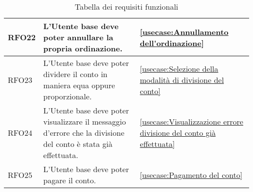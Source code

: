 \begin{table}[H]
\begin{tabularx}{\textwidth}{l|X|p{2cm}}
		\hline
		RFO22       & L'Utente base deve poter annullare la propria ordinazione.                                                     & \autoref{usecase:Annullamento dell'ordinazione}                             \\
		\hline
		RFO23       & L'Utente base deve poter dividere il conto in maniera equa oppure proporzionale.                                                    & \autoref{usecase:Selezione della modalità di divisione del conto}           \\
		\hline
		RFO24       & L'Utente base deve poter visualizzare il messaggio d'errore che la divisione del conto è stata già effettuata. & \autoref{usecase:Visualizzazione errore divisione del conto già effettuata} \\
		\hline
		RFO25       & L'Utente base deve poter pagare il conto.                                                                      & \autoref{usecase:Pagamento del conto}                                       \\
	\end{tabularx}
	\caption{Tabella dei requisiti funzionali}
\end{table}


